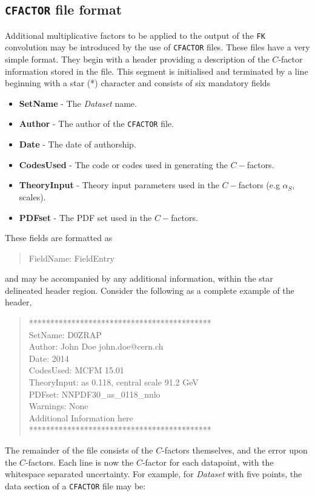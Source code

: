 \documentclass[11pt]{article}
\begin{document}
\subsection{{\tt CFACTOR} file format}
Additional multiplicative factors to be applied to the output of the {\tt FK} convolution may be introduced by the use of {\tt CFACTOR} files. These files have a very simple format. They begin with a header providing a description of the $C$-factor information stored in the file. This segment is initialised and terminated by a line beginning with a star (\mbox{*}) character and consists of six mandatory fields
\begin{itemize}
\item \textbf{SetName} - The \emph{Dataset} name.
\item \textbf{Author} - The author of the {\tt CFACTOR} file.
\item \textbf{Date} - The date of authorship.
\item \textbf{CodesUsed} - The code or codes used in generating the $C-$factors.
\item \textbf{TheoryInput} - Theory input parameters used in the $C-$factors (e.g $\alpha_S$, scales).
\item \textbf{PDFset} - The PDF set used in the $C-$factors.
\end{itemize}
These fields are formatted as 
\begin{quotation}
FieldName: FieldEntry
\end{quotation}
and may be accompanied by any additional information, within the star delineated header region. Consider the following as a complete example of the header,
\begin{quotation}\noindent
*******************************************\\
SetName: D0ZRAP\\
Author: John Doe john.doe@cern.ch \\
Date: 2014\\
CodesUsed: MCFM 15.01\\
TheoryInput: as 0.118, central scale 91.2 GeV\\
PDFset: NNPDF30\_as\_0118\_nnlo\\
Warnings: None\\
Additional Information here\\
*******************************************
\end{quotation}
The remainder of the file consists of the $C$-factors themselves, and the error upon the $C$-factors. Each line is now the $C$-factor for each datapoint, with the whitespace separated uncertainty. For example, for \emph{Dataset} with five points, the data section of a {\tt CFACTOR} file may be:
\end{document}
